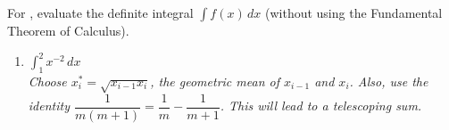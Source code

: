 \documentclass{book}
\newcommand{\dx}{\,dx}
\newcommand{\dint}{\displaystyle \int}
\begin{document}
For , evaluate the definite integral $\dint f(x)\dx$ (without using the Fundamental Theorem of Calculus).
\begin{enumerate}[!HW!]
\begin{multicols}{3}
\itemspade $\dint_{\pi}^\pi \sin^3x\cos^4x\dx$ 
\itemspade \mbox{$\dint_1^0 12x\sqrt{x^2+9}\dx$ if $\dint^1_0 12x\sqrt{x^2+9}\dx =  40\sqrt{10}-108$} 
\end{multicols}
\begin{multicols}{2}
\itemspade $\dint_0^1  (7-3x^2)\dx$ if $\dint_0^1 x^2\dx =  \dfrac{1}{3}$ 
\itemspade $\dint_1^3  (2e^x-2)\dx$ if $\dint_1^3 e^x\dx =  e^3-e$ 
\end{multicols}
\begin{multicols}{2}
\itemspade $\dint_1^3  5e^{x+4}\dx$ if $\dint_1^3 e^x\dx =  e^3-e$ 
\itemspade \mbox{$\dint_1^6 f(x)\dx$ if $\dint_1^7 f(x)\dx=14$ and $\dint_6^7 f(x)\dx = 5.9$} 
\end{multicols}
\itemspade  $\dint_0^{10} (2f(x)+4g(x))\dx$ if $\dint_0^{10} f(x)\dx=39$ and $\dint_0^{10} g(x)\dx = 14$ 
\item \label{exer:definite:stop} $\dint_1^2 x^{-2}\dx$\\
\emph{\color{magenta} Choose $x_i^* =\sqrt{x_{i-1}x_i}$, the geometric mean of $x_{i-1}$ and $x_i$. Also, use the identity $\dfrac{1}{m(m+1)} = \dfrac{1}{m}-\dfrac{1}{m+1}$. This will lead to a telescoping sum.}
 \end{enumerate}
\end{document}
